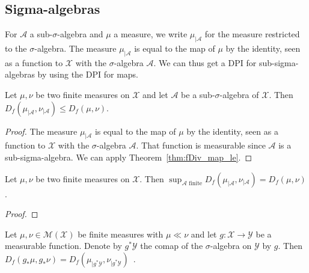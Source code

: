 \subsection{Sigma-algebras}

For $\mathcal A$ a sub-$\sigma$-algebra and $\mu$ a measure, we write $\mathcal \mu_{| \mathcal A}$ for the measure restricted to the $\sigma$-algebra.
The measure $\mathcal \mu_{| \mathcal A}$ is equal to the map of $\mu$ by the identity, seen as a function to $\mathcal X$ with the $\sigma$-algebra $\mathcal A$.
We can thus get a DPI for sub-sigma-algebras by using the DPI for maps.

\begin{theorem}
  \label{thm:fDiv_trim_le}
  \leanok
  Let $\mu, \nu$ be two finite measures on $\mathcal X$ and let $\mathcal A$ be a sub-$\sigma$-algebra of $\mathcal X$. Then
  $D_f(\mu_{| \mathcal A}, \nu_{| \mathcal A}) \le D_f(\mu, \nu)$.
\end{theorem}

\begin{proof}\leanok
{}
The measure $\mathcal \mu_{| \mathcal A}$ is equal to the map of $\mu$ by the identity, seen as a function to $\mathcal X$ with the $\sigma$-algebra $\mathcal A$.
That function is measurable since $\mathcal A$ is a sub-sigma-algebra.
We can apply Theorem~\ref{thm:fDiv_map_le}.
\end{proof}


\begin{theorem}
  \label{thm:iSup_fDiv_trim}
  Let $\mu, \nu$ be two finite measures on $\mathcal X$. Then
  $\sup_{\mathcal A \text{ finite}} D_f(\mu_{| \mathcal A}, \nu_{| \mathcal A}) = D_f(\mu, \nu)$.
\end{theorem}

\begin{proof}
\end{proof}


\begin{lemma}
  \label{lem:fDiv_map_eq_fDiv_trim_of_ac}
  \leanok
  Let $\mu, \nu \in \mathcal M(\mathcal X)$ be finite measures with $\mu \ll \nu$ and let $g : \mathcal X \to \mathcal Y$ be a measurable function. Denote by $g^* \mathcal Y$ the comap of the $\sigma$-algebra on $\mathcal Y$ by $g$. Then
  $D_f(g_* \mu, g_* \nu) = D_f(\mu_{| g^* \mathcal Y}, \nu_{| g^* \mathcal Y})$~.
\end{lemma}

